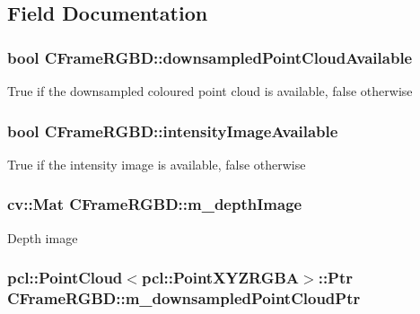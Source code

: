 \subsection{Field Documentation}
\hypertarget{class_c_frame_r_g_b_d_a06f87da2b36ef01b47ac338adb6443ea}{
\subsubsection[{downsampledPointCloudAvailable}]{\setlength{\rightskip}{0pt plus 5cm}bool {\bf CFrameRGBD::downsampledPointCloudAvailable}}}
\label{class_c_frame_r_g_b_d_a06f87da2b36ef01b47ac338adb6443ea}
True if the downsampled coloured point cloud is available, false otherwise \hypertarget{class_c_frame_r_g_b_d_a445d7d67bbff8cdac482e1c10dba2dc9}{
\subsubsection[{intensityImageAvailable}]{\setlength{\rightskip}{0pt plus 5cm}bool {\bf CFrameRGBD::intensityImageAvailable}}}
\label{class_c_frame_r_g_b_d_a445d7d67bbff8cdac482e1c10dba2dc9}
True if the intensity image is available, false otherwise \hypertarget{class_c_frame_r_g_b_d_a1dbfcec74d90c8cc98018a9f0df6c708}{
\subsubsection[{m\_\-depthImage}]{\setlength{\rightskip}{0pt plus 5cm}cv::Mat {\bf CFrameRGBD::m\_\-depthImage}}}
\label{class_c_frame_r_g_b_d_a1dbfcec74d90c8cc98018a9f0df6c708}
Depth image \hypertarget{class_c_frame_r_g_b_d_aaff14ee9689f9d2d895300e5236be6d0}{
\subsubsection[{m\_\-downsampledPointCloudPtr}]{\setlength{\rightskip}{0pt plus 5cm}pcl::PointCloud$<$pcl::PointXYZRGBA$>$::Ptr {\bf CFrameRGBD::m\_\-downsampledPointCloudPtr}}}
